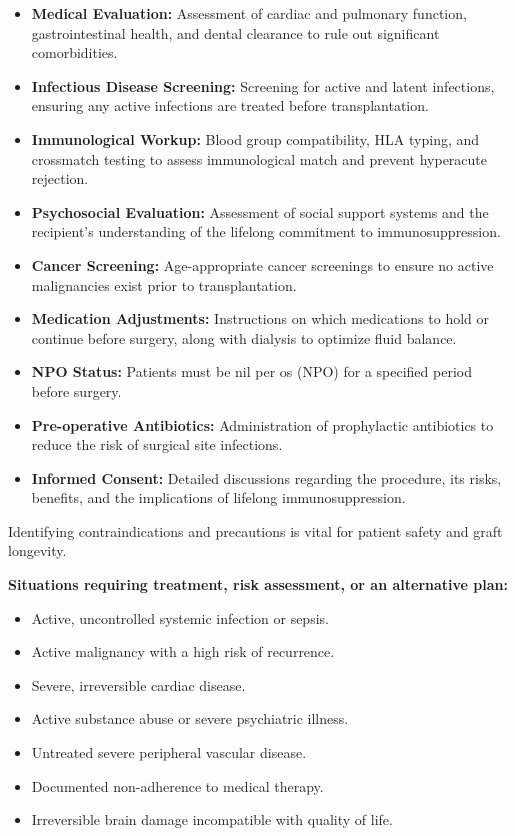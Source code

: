 \begin{itemize}
  \item \textbf{Medical Evaluation:} Assessment of cardiac and pulmonary function, gastrointestinal health, and dental clearance to rule out significant comorbidities.
  
  \item \textbf{Infectious Disease Screening:} Screening for active and latent infections, ensuring any active infections are treated before transplantation.
  
  \item \textbf{Immunological Workup:} Blood group compatibility, HLA typing, and crossmatch testing to assess immunological match and prevent hyperacute rejection.
  
  \item \textbf{Psychosocial Evaluation:} Assessment of social support systems and the recipient's understanding of the lifelong commitment to immunosuppression.
  
  \item \textbf{Cancer Screening:} Age-appropriate cancer screenings to ensure no active malignancies exist prior to transplantation.
  
  \item \textbf{Medication Adjustments:} Instructions on which medications to hold or continue before surgery, along with dialysis to optimize fluid balance.
  
  \item \textbf{NPO Status:} Patients must be nil per os (NPO) for a specified period before surgery.
  
  \item \textbf{Pre-operative Antibiotics:} Administration of prophylactic antibiotics to reduce the risk of surgical site infections.
  
  \item \textbf{Informed Consent:} Detailed discussions regarding the procedure, its risks, benefits, and the implications of lifelong immunosuppression.
\end{itemize}

Identifying contraindications and precautions is vital for patient safety and graft longevity.

\textbf{Situations requiring treatment, risk assessment, or an alternative plan:}
\begin{itemize}
  \item Active, uncontrolled systemic infection or sepsis.
  \item Active malignancy with a high risk of recurrence.
  \item Severe, irreversible cardiac disease.
  \item Active substance abuse or severe psychiatric illness.
  \item Untreated severe peripheral vascular disease.
  \item Documented non-adherence to medical therapy.
  \item Irreversible brain damage incompatible with quality of life.
\end{itemize}

